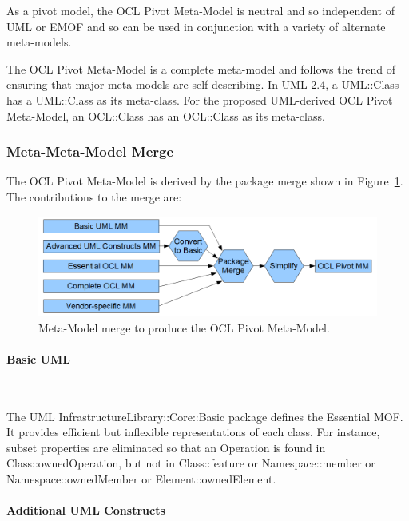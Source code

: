 \documentclass{eceasst}
\begin{document}
As a pivot model, the OCL Pivot Meta-Model is neutral and so independent of UML or EMOF and so can be used in conjunction with a variety of alternate meta-models.

The OCL Pivot Meta-Model is a complete meta-model and follows the trend of ensuring that major meta-models are self describing. In UML 2.4, a UML::Class has a UML::Class as its meta-class. For the proposed UML-derived OCL Pivot Meta-Model, an OCL::Class has an OCL::Class as its meta-class.  

\subsubsection{Meta-Meta-Model Merge}

The OCL Pivot Meta-Model is derived by the package merge  shown in Figure~\ref{fig:UMLMMtoOCLMM}. The contributions to the merge are:


\begin{figure}
  \begin{center}
    \includegraphics[width=5.0in]{UMLMMtoOCLMM.png}
  \end{center}
  \caption{Meta-Model merge to produce the OCL Pivot Meta-Model.}
  \label{fig:UMLMMtoOCLMM}
\end{figure}

\paragraph{Basic UML}~

The UML InfrastructureLibrary::Core::Basic package defines the Essential MOF. It provides efficient but inflexible representations of each class. For instance, subset properties are eliminated so that an Operation is found in Class::ownedOperation, but not in Class::feature or Namespace::member or Namespace::ownedMember or Element::ownedElement.

\paragraph{Additional UML Constructs}~
\end{document}
